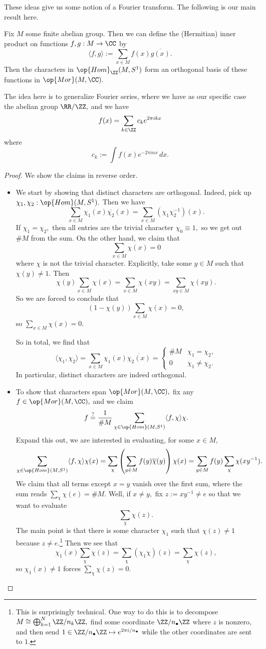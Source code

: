 These ideas give us some notion of a Fourier transform. The following is our main result here.
\begin{theorem}
	Fix $M$ some finite abelian group. Then we can define the (Hermitian) inner product on functions $f,g:M\to\CC$ by
	\[\langle f,g\rangle:=\sum_{x\in M}f(x)\overline{g(x)}.\]
	Then the characters in $\op{Hom}_\ZZ(M,S^1)$ form an orthogonal basis of these functions in $\op{Mor}(M,\CC).$
\end{theorem}
The idea here is to generalize Fourier series, where we have as our specific case the abelian group $\RR/\ZZ,$ and we have
\[f(x)=\sum_{k\in\ZZ}c_ke^{2\pi ikx}\]
where
\[c_k:=\int f(x)e^{-2\pi inx}\,dx.\]
\begin{proof}
	We show the claims in reverse order.
	\begin{itemize}
		\item We start by showing that distinct characters are orthogonal. Indeed, pick up $\chi_1,\chi_2:\op{Hom}(M,S^1).$ Then we have
		\[\sum_{x\in M}\chi_1(x)\overline{\chi_2}(x)=\sum_{x\in M}(\chi_1\chi_2^{-1})(x).\]
		If $\chi_1=\chi_2,$ then all entries are the trivial character $\chi_0\equiv1,$ so we get out $\#M$ from the sum. On the other hand, we claim that
		\[\sum_{x\in M}\chi(x)=0\]
		where $\chi$ is not the trivial character. Explicitly, take some $y\in M$ such that $\chi(y)\ne1.$ Then
		\[\chi(y)\sum_{x\in M}\chi(x)=\sum_{x\in M}\chi(xy)=\sum_{xy\in M}\chi(xy).\]
		So we are forced to conclude that
		\[(1-\chi(y))\sum_{x\in M}\chi(x)=0,\]
		so $\sum_{x\in M}\chi(x)=0.$
	
		So in total, we find that
		\[\langle\chi_1,\chi_2\rangle=\sum_{x\in M}\chi_1(x)\overline{\chi_2(x)}=\begin{cases}
			\#M & \chi_1=\chi_2, \\
			0 & \chi_1\ne\chi_2.
		\end{cases}\]
		In particular, distinct characters are indeed orthogonal.
		\item To show that characters span $\op{Mor}(M,\CC),$ fix any $f\in\op{Mor}(M,\CC),$ and we claim
		\[f\stackrel?=\frac1{\#M}\sum_{\chi\in\op{Hom}(M,S^1)}\langle f,\chi\rangle\chi.\]
		Expand this out, we are interested in evaluating, for some $x\in M,$
		\[\sum_{\chi\in\op{Hom}(M,S^1)}\langle f,\chi\rangle\chi(x)=\sum_\chi\left(\sum_{y\in M}f(y)\overline\chi(y)\right)\chi(x)=\sum_{y\in M}f(y)\sum_\chi\chi(xy^{-1}).\]
		We claim that all terms except $x=y$ vanish over the first sum, where the sum reads $\sum_\chi\chi(e)=\#M.$ Well, if $x\ne y,$ fix $z:=xy^{-1}\ne e$ so that we want to evaluate
		\[\sum_\chi\chi(z).\]
		The main point is that there is some character $\chi_1$ such that $\chi(z)\ne1$ because $z\ne e.$\footnote{This is surprisingly technical. One way to do this is to decompose $M\cong\bigoplus_{k=1}^N\ZZ/n_k\ZZ,$ find some coordinate $\ZZ/n_\bullet\ZZ$ where $z$ is nonzero, and then send $1\in\ZZ/n_\bullet\ZZ\mapsto e^{2\pi i/n_\bullet}$ while the other coordinates are sent to $1.$} Then we see that
		\[\chi_1(x)\sum_\chi\chi(z)=\sum_\chi(\chi_1\chi)(z)=\sum_\chi\chi(z),\]
		so $\chi_1(x)\ne1$ forces $\sum_\chi\chi(z)=0.$
		

\end{itemize}
\end{proof}
